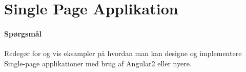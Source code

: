 \section{Single Page Applikation}

\paragraph{Spørgsmål}
Redegør for og vis eksampler på hvordan man kan designe	og implementere Single-page applikationer med brug af	Angular2 eller nyere.
